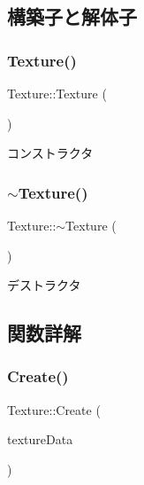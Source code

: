 \subsection{構築子と解体子}
\mbox{\label{class_texture_a6c275e3f186675ff6ed73ccf970e552f}} 
\subsubsection{\texorpdfstring{Texture()}{Texture()}}
{\footnotesize\ttfamily Texture\+::\+Texture (\begin{DoxyParamCaption}{ }\end{DoxyParamCaption})}



コンストラクタ 

\mbox{\label{class_texture_a09c4bcb7462f64c1d20fa69dba3cee8a}} 
\subsubsection{\texorpdfstring{$\sim$\+Texture()}{~Texture()}}
{\footnotesize\ttfamily Texture\+::$\sim$\+Texture (\begin{DoxyParamCaption}{ }\end{DoxyParamCaption})}



デストラクタ 



\subsection{関数詳解}
\mbox{\label{class_texture_ab52334c24fcd84853ba455d8ed282ae4}} 
\subsubsection{\texorpdfstring{Create()}{Create()}}
{\footnotesize\ttfamily Texture\+::\+Create (\begin{DoxyParamCaption}\item[{Com\+Ptr$<$ I\+D3\+D12\+Resource $>$}]{texture\+Data }\end{DoxyParamCaption})\hspace{0.3cm}{\ttfamily [static]}}

